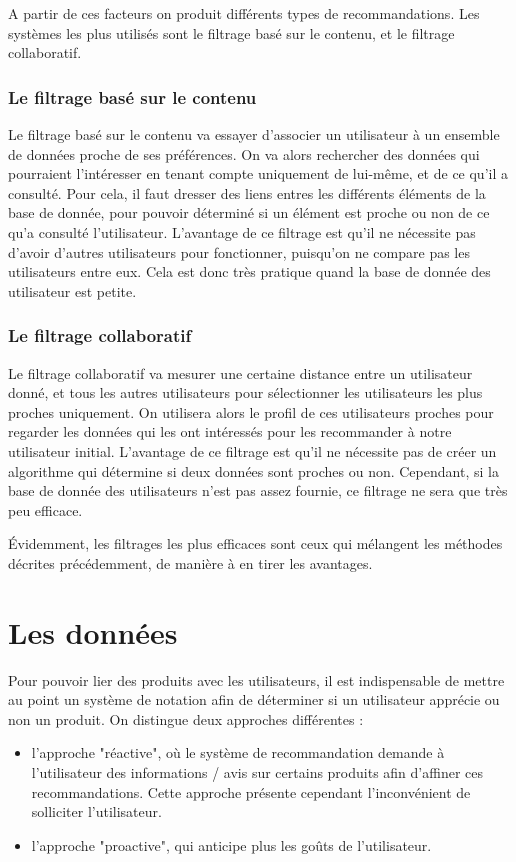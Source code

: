 \documentclass{report}
\begin{document}
A partir de ces facteurs on produit différents types de recommandations.
Les systèmes les plus utilisés sont le filtrage basé sur le contenu, et le filtrage collaboratif.

\subsubsection{Le filtrage basé sur le contenu}
Le filtrage basé sur le contenu va essayer d'associer un utilisateur à un ensemble de données proche de ses préférences. On va alors rechercher des données qui pourraient l'intéresser en tenant compte uniquement de lui-même, et de ce qu'il a consulté. Pour cela, il faut dresser des liens entres les différents éléments de la base de donnée, pour pouvoir déterminé si un élément est proche ou non de ce qu'a consulté l'utilisateur.
L'avantage de ce filtrage est qu'il ne nécessite pas d'avoir d'autres utilisateurs pour fonctionner, puisqu'on ne compare pas les utilisateurs entre eux. Cela est donc très pratique quand la base de donnée des utilisateur est petite.
\subsubsection{Le filtrage collaboratif}
Le filtrage collaboratif va mesurer une certaine distance entre un utilisateur donné, et tous les autres utilisateurs pour sélectionner les utilisateurs les plus proches uniquement.
On utilisera alors le profil de ces utilisateurs proches pour regarder les données qui les ont intéressés pour les recommander à notre utilisateur initial.
L'avantage de ce filtrage est qu'il ne nécessite pas de créer un algorithme qui détermine si deux données sont proches ou non. Cependant, si la base de donnée des utilisateurs n'est pas assez fournie, ce filtrage ne sera que très peu efficace.\par
Évidemment, les filtrages les plus efficaces sont ceux qui mélangent les méthodes décrites précédemment, de manière à en tirer les avantages.

\section{Les données}
Pour pouvoir lier des produits avec les utilisateurs, il est indispensable de mettre au point un système de notation afin de déterminer si un utilisateur apprécie ou non un produit.
On distingue deux approches différentes :
\begin{itemize}
  \item l'approche "réactive", où le système de recommandation demande à l'utilisateur des informations / avis sur certains produits afin d'affiner ces recommandations. Cette approche présente cependant l'inconvénient de solliciter l'utilisateur.
  \item l'approche "proactive", qui anticipe plus les goûts de l'utilisateur.
\end{itemize}
\end{document}
